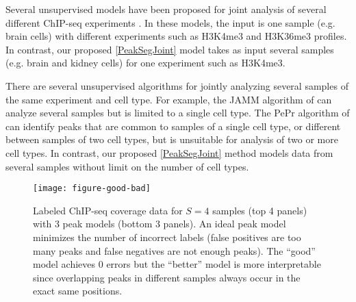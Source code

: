 \documentclass{article} %
\begin{document}
Several unsupervised models have been proposed for joint analysis of
several different ChIP-seq experiments
\citep{jmosaics,segway,chromhmm}. In these models, the input is one
sample (e.g. brain cells) with different experiments such as H3K4me3
and H3K36me3 profiles. In contrast, our proposed \ref{PeakSegJoint} model
takes as input several samples (e.g. brain and kidney cells) for one
experiment such as H3K4me3.

There are several unsupervised algorithms for jointly analyzing
several samples of the same experiment and cell type. For example, the
JAMM algorithm of \citet{JAMM} can analyze several samples but is
limited to a single cell type. 
The PePr algorithm of \citet{PePr} can identify peaks that are common
to samples of a single cell type, or different between samples of two
cell types, but is unsuitable for analysis of two or more cell
types. In contrast, our proposed \ref{PeakSegJoint} method models data
from several samples without limit on the number of cell types.

\begin{figure}[b!]
  \centering
  \texttt{[image: figure-good-bad]}
  \vskip -0.5cm
  \caption{Labeled ChIP-seq coverage data for $S=4$ samples (top 4
    panels) with 3 peak models (bottom 3 panels).
    An ideal peak model minimizes the number of incorrect labels
    (false positives are too many peaks and false negatives are not
    enough peaks). The ``good'' model achieves 0 errors but the
    ``better'' model is more interpretable since overlapping peaks in
    different samples always occur in the exact same positions.}
  \label{fig:good-bad}
\end{figure}

\end{document}
